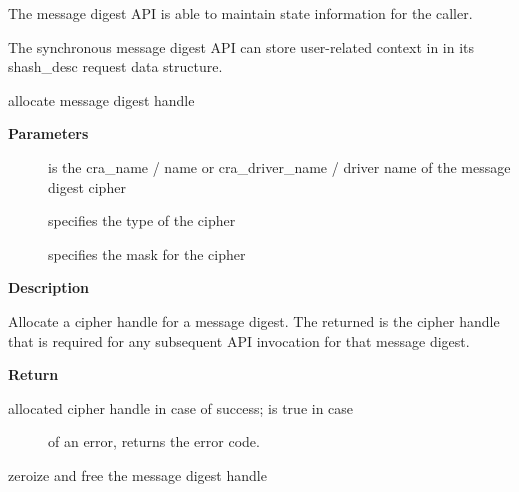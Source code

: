 \documentclass[a4paper,8pt,english]{sphinxmanual}
\begin{document}
The message digest API is able to maintain state information for the
caller.

The synchronous message digest API can store user-related context in in its
shash\_desc request data structure.

\begin{fulllineitems}
\label{crypto/api-digest:c.crypto_alloc_shash}
allocate message digest handle

\end{fulllineitems}


\textbf{Parameters}
\begin{description}
\item[{}] \leavevmode
is the cra\_name / name or cra\_driver\_name / driver name of the
message digest cipher

\item[{}] \leavevmode
specifies the type of the cipher

\item[{}] \leavevmode
specifies the mask for the cipher

\end{description}

\textbf{Description}

Allocate a cipher handle for a message digest. The returned  is the cipher handle that is required for any subsequent
API invocation for that message digest.

\textbf{Return}
\begin{description}
\item[{allocated cipher handle in case of success;  is true in case}] \leavevmode
of an error,  returns the error code.

\end{description}

\begin{fulllineitems}
\label{crypto/api-digest:c.crypto_free_shash}
zeroize and free the message digest handle

\end{fulllineitems}
\end{document}
